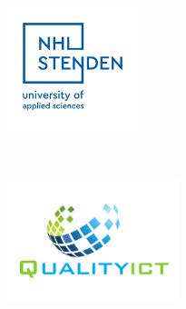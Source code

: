 \thispagestyle{empty}

\begin{minipage}[b]{0.6\linewidth}
    \includegraphics[height=4cm, width=3.8cm]{Figures/Stenden.jpg}
\end{minipage}
\begin{minipage}[b]{0.35\linewidth}
    \includegraphics[height=5cm, width=5cm]{Figures/Q-ICT.pdf}
\end{minipage}

\vspace{2cm}

